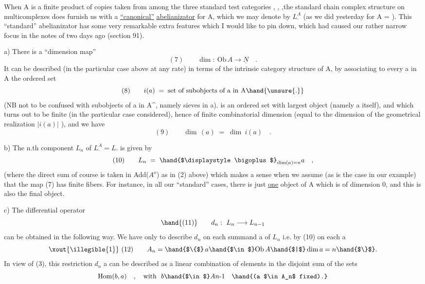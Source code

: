 
When A is a finite product of copies taken from among the three
standard test categories \hand{$\Delta$},\hand{$\square$} ,\hand{$\bigcirc$} ,the standard chain complex structure
on multicomplexes does furnish us with a \uline{``canonical''} \uline{abelianizator}
for A, which we may denote by $L_{\cdot}^{A}$ (as we did yesterday for A =\hand{$\Delta$} ).
This ``standard'' abelianizator has some very remarkable extra features
which I would like to pin down,  which had caused our rather narrow
focus in the notes of two days ago (section 91).

a) There is a ``dimension map''
\[ (7) \qquad \dim:\ \mathrm{Ob}\,A \longrightarrow \underline{N} \quad . \]
It can be described (in the particular case above at any rate) in terms
of the intrinsic category structure of A, by associating to every a in
A the ordered set
\[ (8) \qquad i(a) \;=\; \text{set of subobjects of a in A} \hand{\unsure{.}} \]
(NB not to be confused with subobjects of a in A\^{}, namely sieves in
a).  is an ordered set with  largest object  (namely a itself),
and which turns out to be finite (in the particular case considered),
hence of finite combinatorial dimension (equal to the dimension of the
geometrical realization $|i(a)|$ ), and we have
\[ (9) \qquad \dim\,(a) \;=\; \dim\ i(a) \quad . \]

b) The n.th component $L_n$ of $L_{\cdot}^{A} = L.$ is given by
\[ (10) \qquad L_n \;=\; \hand{$\displaystyle\bigoplus$}_{\dim(a)=n} a \quad , \]
(where the direct sum of course is taken in Add($A^{o}$) as in (2) above\hand{,})
which makes a sense when we assume (as is the case in our example)
that the map (7)   has finite fibers. For instance, in
all  our ``standard'' cases, there is just \uline{one} object of A which is
of dimension 0,  and this is also the final object.

c) The differential operator
\[ \hand{(11)} \qquad d_n:\ L_n \longrightarrow L_{n-1} \]
can be obtained in the following way. We have only to describe $d_n$ on
each summand a of $L_n$ i.e. by (10) on each a  
\[ \xout{\illegible{1}} \ (12) \qquad A_n = \hand{$\{$}\, a \hand{$\in$} \mathrm{Ob}\,A \hand{$|$} \dim a = n \hand{$\}$}. \]
In view of (3), this restriction $d_n$ \hand{$|$} a can be described as a linear
combination of elements in the disjoint sum of the sets
\[ \mathrm{Hom}(b,a) \quad , \quad \text{with}\ \ b \hand{$\in$} An\text{-}1 \quad \hand{(a $\in A_n$ fixed).} \]

